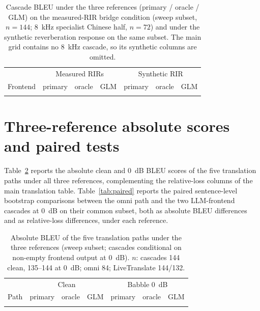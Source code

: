 \documentclass[11pt]{article}
\begin{document}
\begin{table}[h]
\centering
\caption{Cascade BLEU under the three references (primary / oracle / GLM)
on the measured-RIR bridge condition (sweep subset, $n{=}144$; 8~kHz
specialist Chinese half, $n{=}72$) and under the synthetic reverberation
response on the same subset. The main grid contains no 8~kHz cascade, so
its synthetic columns are omitted.}
\label{tab:revmitcas}
\small
\begin{tabular}{lcccccc}
\toprule
 & \multicolumn{3}{c}{Measured RIRs} & \multicolumn{3}{c}{Synthetic RIR} \\
Frontend & primary & oracle & GLM & primary & oracle & GLM \\
\midrule
 \\
\bottomrule
\end{tabular}
\end{table}

\section{Three-reference absolute scores and paired tests}
\label{supp:threeref}

Table~\ref{tab:threeref} reports the absolute clean and 0~dB BLEU scores
of the five translation paths under all three references, complementing
the relative-loss columns of the main translation table.
Table~\ref{tab:paired} reports the paired sentence-level bootstrap
comparisons between the omni path and the two LLM-frontend cascades at
0~dB on their common subset, both as absolute BLEU differences and as
relative-loss differences, under each reference.

\begin{table}[h]
\centering
\caption{Absolute BLEU of the five translation paths under the three
references (sweep subset; cascades conditional on non-empty frontend
output at 0~dB). $n$: cascades 144 clean, 135--144 at 0~dB; omni 84;
LiveTranslate 144/132.}
\label{tab:threeref}
\small
\setlength{\tabcolsep}{4pt}
\begin{tabular}{lcccccc}
\toprule
 & \multicolumn{3}{c}{Clean} & \multicolumn{3}{c}{Babble 0~dB} \\
Path & primary & oracle & GLM & primary & oracle & GLM \\
\midrule
 \\
\bottomrule
\end{tabular}
\end{table}
\end{document}
